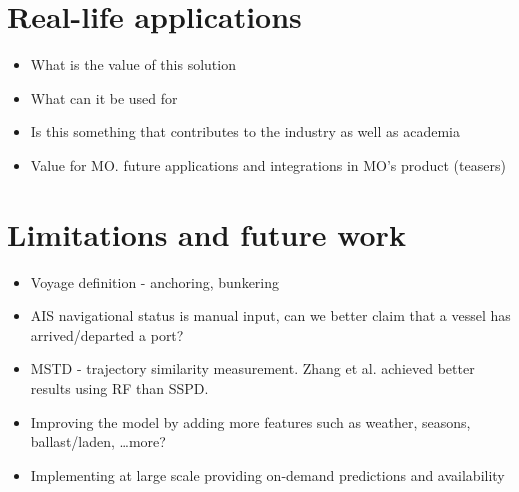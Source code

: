\section{Real-life applications}

\begin{itemize}
    \item What is the value of this solution
    \item What can it be used for
    \item Is this something that contributes to the industry as well as academia
    \item Value for MO. future applications and integrations in MO's product (teasers)
\end{itemize}

\section{Limitations and future work}

\begin{itemize}
    \item Voyage definition - anchoring, bunkering
    \item AIS navigational status is manual input, can we better claim that a vessel has arrived/departed a port?
    \item MSTD - trajectory similarity measurement. Zhang et al. achieved better results using RF than SSPD.
    \item Improving the model by adding more features such as weather, seasons, ballast/laden, \ldots more?
    \item Implementing at large scale providing on-demand predictions and availability
\end{itemize}
